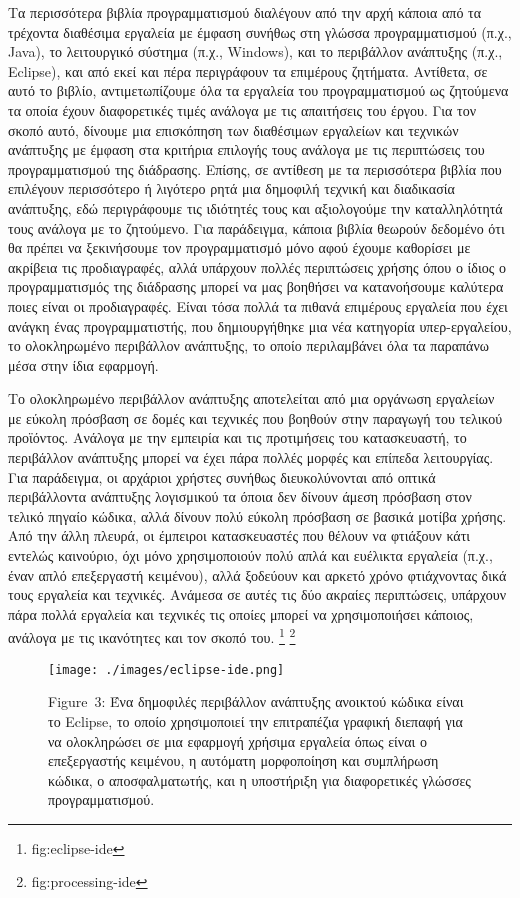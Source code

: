 \documentclass[
]{article}
\begin{document}
Τα περισσότερα βιβλία προγραμματισμού διαλέγουν από την αρχή κάποια από
τα τρέχοντα διαθέσιμα εργαλεία με έμφαση συνήθως στη γλώσσα
προγραμματισμού (π.χ., Java), το λειτουργικό σύστημα (π.χ., Windows),
και το περιβάλλον ανάπτυξης (π.χ., Eclipse), και από εκεί και πέρα
περιγράφουν τα επιμέρους ζητήματα. Αντίθετα, σε αυτό το βιβλίο,
αντιμετωπίζουμε όλα τα εργαλεία του προγραμματισμού ως ζητούμενα τα
οποία έχουν διαφορετικές τιμές ανάλογα με τις απαιτήσεις του έργου. Για
τον σκοπό αυτό, δίνουμε μια επισκόπηση των διαθέσιμων εργαλείων και
τεχνικών ανάπτυξης με έμφαση στα κριτήρια επιλογής τους ανάλογα με τις
περιπτώσεις του προγραμματισμού της διάδρασης. Επίσης, σε αντίθεση με τα
περισσότερα βιβλία που επιλέγουν περισσότερο ή λιγότερο ρητά μια
δημοφιλή τεχνική και διαδικασία ανάπτυξης, εδώ περιγράφουμε τις
ιδιότητές τους και αξιολογούμε την καταλληλότητά τους ανάλογα με το
ζητούμενο. Για παράδειγμα, κάποια βιβλία θεωρούν δεδομένο ότι θα πρέπει
να ξεκινήσουμε τον προγραμματισμό μόνο αφού έχουμε καθορίσει με ακρίβεια
τις προδιαγραφές, αλλά υπάρχουν πολλές περιπτώσεις χρήσης όπου ο ίδιος ο
προγραμματισμός της διάδρασης μπορεί να μας βοηθήσει να κατανοήσουμε
καλύτερα ποιες είναι οι προδιαγραφές. Είναι τόσα πολλά τα πιθανά
επιμέρους εργαλεία που έχει ανάγκη ένας προγραμματιστής, που
δημιουργήθηκε μια νέα κατηγορία υπερ-εργαλείου, το ολοκληρωμένο
περιβάλλον ανάπτυξης, το οποίο περιλαμβάνει όλα τα παραπάνω μέσα στην
ίδια εφαρμογή.

Το ολοκληρωμένο περιβάλλον ανάπτυξης αποτελείται από μια οργάνωση
εργαλείων με εύκολη πρόσβαση σε δομές και τεχνικές που βοηθούν στην
παραγωγή του τελικού προϊόντος. Ανάλογα με την εμπειρία και τις
προτιμήσεις του κατασκευαστή, το περιβάλλον ανάπτυξης μπορεί να έχει
πάρα πολλές μορφές και επίπεδα λειτουργίας. Για παράδειγμα, οι αρχάριοι
χρήστες συνήθως διευκολύνονται από οπτικά περιβάλλοντα ανάπτυξης
λογισμικού τα όποια δεν δίνουν άμεση πρόσβαση στον τελικό πηγαίο κώδικα,
αλλά δίνουν πολύ εύκολη πρόσβαση σε βασικά μοτίβα χρήσης. Από την άλλη
πλευρά, οι έμπειροι κατασκευαστές που θέλουν να φτιάξουν κάτι εντελώς
καινούριο, όχι μόνο χρησιμοποιούν πολύ απλά και ευέλικτα εργαλεία (π.χ.,
έναν απλό επεξεργαστή κειμένου), αλλά ξοδεύουν και αρκετό χρόνο
φτιάχνοντας δικά τους εργαλεία και τεχνικές. Ανάμεσα σε αυτές τις δύο
ακραίες περιπτώσεις, υπάρχουν πάρα πολλά εργαλεία και τεχνικές τις
οποίες μπορεί να χρησιμοποιήσει κάποιος, ανάλογα με τις ικανότητες και
τον σκοπό του. \footnote{fig:eclipse-ide} \footnote{fig:processing-ide}

\leavevmode{}%
\begin{figure}
\hypertarget{fig:eclipse-ide}{%
\centering
\texttt{[image: ./images/eclipse-ide.png]}
\caption{Figure~3: Ένα δημοφιλές περιβάλλον ανάπτυξης ανοικτού κώδικα
είναι το Eclipse, το οποίο χρησιμοποιεί την επιτραπέζια γραφική διεπαφή
για να ολοκληρώσει σε μια εφαρμογή χρήσιμα εργαλεία όπως είναι ο
επεξεργαστής κειμένου, η αυτόματη μορφοποίηση και συμπλήρωση κώδικα, ο
αποσφαλματωτής, και η υποστήριξη για διαφορετικές γλώσσες
προγραμματισμού.}\label{fig:eclipse-ide}
}
\end{figure}
\end{document}
